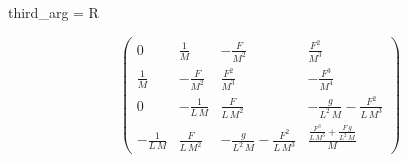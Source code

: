third_arg = R

\begin{equation}
\left(\begin{array}{cccc} 0 & \frac{1}{M} & -\frac{F}{M^2} & \frac{F^2}{M^3}\\ \frac{1}{M} & -\frac{F}{M^2} & \frac{F^2}{M^3} & -\frac{F^3}{M^4}\\ 0 & -\frac{1}{L\,M} & \frac{F}{L\,M^2} & -\frac{g}{L^2\,M}-\frac{F^2}{L\,M^3}\\ -\frac{1}{L\,M} & \frac{F}{L\,M^2} & -\frac{g}{L^2\,M}-\frac{F^2}{L\,M^3} & \frac{\frac{F^3}{L\,M^3}+\frac{F\,g}{L^2\,M}}{M} \end{array}\right)
\end{equation}
